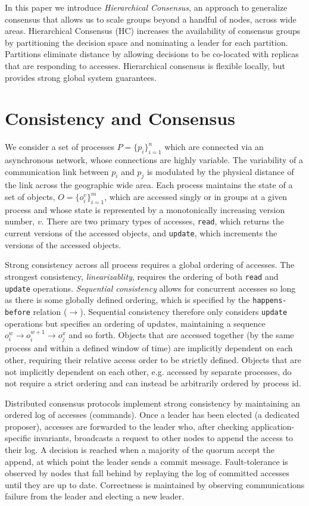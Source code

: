 \documentclass[sigconf]{acmart}
\begin{document}
In this paper we introduce \textit{Hierarchical Consensus}, an approach to generalize
consensus that allows us to scale groups beyond a handful of nodes, across wide areas.
Hierarchical Consensus (HC) increases the availability of consensus groups by
partitioning the decision space and nominating a leader for each partition.
Partitions eliminate distance by allowing decisions to be co-located with replicas that
are responding to accesses. Hierarchical consensus is flexible locally, but provides
strong global system guarantees.

\section{Consistency and Consensus}

We consider a set of processes $P = \{p_i\}_{i=1}^n$ which are connected via an asynchronous network, whose connections are highly variable.
The variability of a communication link between $p_i$ and $p_j$ is modulated by the
physical distance of the link across the geographic wide area.
Each process maintains the state of a set of objects, $O = \{o_i^v\}_{i=1}^m$, which are
accessed singly or in groups at a given process and whose state is represented by a monotonically increasing version number, $v$. There are two primary types of accesses, \texttt{read}, which returns the current versions of the accessed objects, and \texttt{update}, which increments the versions of the accessed objects.

Strong consistency across all process requires a global ordering of accesses. The strongest consistency, \textit{linearizablity}, requires the ordering of both \texttt{read} and \texttt{update} operations. \textit{Sequential consistency} allows for concurrent accesses so long as there is some globally defined ordering, which is specified by the \texttt{happens-before} relation ($\rightarrow$). Sequential consistency therefore only considers \texttt{update} operations but specifies an ordering of updates, maintaining a sequence $o_i^w \rightarrow o_i^{w+1} \rightarrow o_j^x$ and so forth. Objects that are accessed together (by the same process and within a defined window of time) are implicitly dependent on each other, requiring their relative access order to be strictly defined. Objects that are not implicitly dependent on each other, e.g. accessed by separate processes, do not require a strict ordering and can instead be arbitrarily ordered by process id.

Distributed consensus protocols implement strong consistency by maintaining an ordered log of accesses (commands). Once a leader has been elected (a dedicated proposer), accesses are forwarded to the leader who, after checking application-specific invariants, broadcasts a request to other nodes to append the access to their log. A decision is reached when a majority of the quorum accept the append, at which point the leader sends a commit message. Fault-tolerance is observed by nodes that fall behind by replaying the log of committed accesses until they are up to date. Correctness is maintained by observing communications failure from the leader and electing a new leader.
\end{document}
